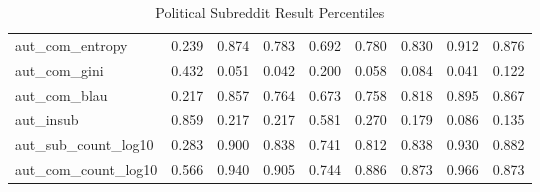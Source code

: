 \begin{table}
\begin{tabular}{lrrrrrrrr}
aut\_com\_entropy     &       0.239 &        0.874 &         0.783 &     0.692 &         0.780 &      0.830 &                0.912 &                0.876 \\
aut\_com\_gini        &       0.432 &        0.051 &         0.042 &     0.200 &         0.058 &      0.084 &                0.041 &                0.122 \\
aut\_com\_blau        &       0.217 &        0.857 &         0.764 &     0.673 &         0.758 &      0.818 &                0.895 &                0.867 \\
aut\_insub           &       0.859 &        0.217 &         0.217 &     0.581 &         0.270 &      0.179 &                0.086 &                0.135 \\
aut\_sub\_count\_log10 &       0.283 &        0.900 &         0.838 &     0.741 &         0.812 &      0.838 &                0.930 &                0.882 \\
aut\_com\_count\_log10 &       0.566 &        0.940 &         0.905 &     0.744 &         0.886 &      0.873 &                0.966 &                0.873 \\
\bottomrule
\end{tabular}
\caption{Political Subreddit Result Percentiles}
\label{table/pol:pct}
\end{table}